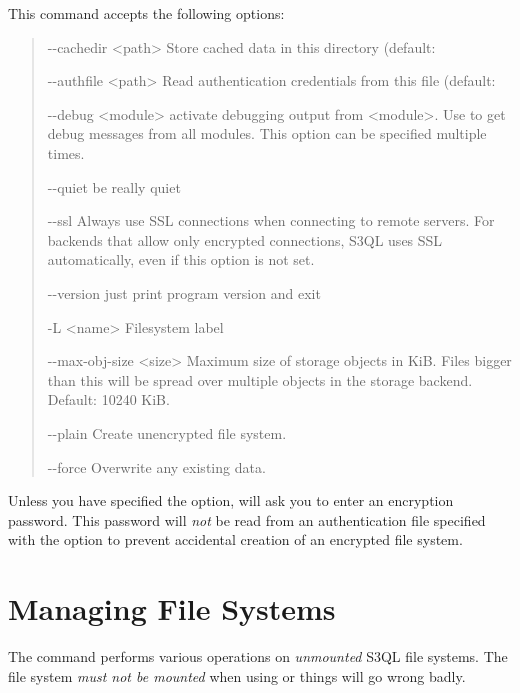 \documentclass[letterpaper,10pt,english]{sphinxmanual}
\begin{document}
This command accepts the following options:
\begin{quote}
\begin{optionlist}{3cm}
\item [-{-}cachedir \textless{}path\textgreater{}]  
Store cached data in this directory (default:
\item [-{-}authfile \textless{}path\textgreater{}]  
Read authentication credentials from this file
(default: 
\item [-{-}debug \textless{}module\textgreater{}]  
activate debugging output from \textless{}module\textgreater{}. Use  to
get debug messages from all modules. This option can
be specified multiple times.
\item [-{-}quiet]  
be really quiet
\item [-{-}ssl]  
Always use SSL connections when connecting to remote
servers. For backends that allow only encrypted
connections, S3QL uses SSL automatically, even if this
option is not set.
\item [-{-}version]  
just print program version and exit
\item [-L \textless{}name\textgreater{}]  
Filesystem label
\item [-{-}max-obj-size \textless{}size\textgreater{}]  
Maximum size of storage objects in KiB. Files bigger
than this will be spread over multiple objects in the
storage backend. Default: 10240 KiB.
\item [-{-}plain]  
Create unencrypted file system.
\item [-{-}force]  
Overwrite any existing data.
\end{optionlist}
\end{quote}

Unless you have specified the  option,  will ask
you to enter an encryption password. This password will \emph{not} be read
from an authentication file specified with the 
option to prevent accidental creation of an encrypted file system.


\chapter{Managing File Systems}
\label{adm:managing-file-systems}\label{adm::doc}
The  command performs various operations on \emph{unmounted} S3QL
file systems. The file system \emph{must not be mounted} when using
 or things will go wrong badly.
\end{document}
